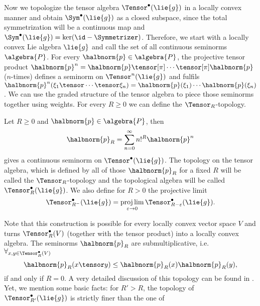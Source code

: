 \documentclass[
11pt,                          %
english                        %
]{article}
\begin{document}
Now we topologize the tensor algebra $\Tensor^{\bullet}(\lie{g})$ in a locally convex 
manner and obtain $\Sym^{\bullet}(\lie{g})$ as a closed subspace, since the total 
symmetrization will be a continuous map and $\Sym^{\bullet}(\lie{g}) = \ker (\id - 
\Symmetrizer)$. Therefore, we start with a locally convex Lie algebra $\lie{g}$ and 
call the set of all continuous seminorms $\algebra{P}$. For every $\halbnorm{p} \in 
\algebra{P}$, the projective tensor product $\halbnorm{p}^n = \halbnorm{p} 
\tensor[\pi] \cdots \tensor[\pi] \halbnorm{p}$ ($n$-times) defines a seminorm on 
$\Tensor^n(\lie{g})$ and fulfils $\halbnorm{p}^n(\xi_1 \tensor \cdots \tensor \xi_n) 
= \halbnorm{p}(\xi_1) \cdots \halbnorm{p}(\xi_n)$. We can use the graded structure of 
the tensor algebra to piece those seminorms together using weights. For every 
$R \geq 0$ we can define the $\Tensor_R$-topology.
\begin{definition}
	\label{def:TR-topology}
	Let $R \geq 0$ and $\halbnorm{p} \in \algebra{P}$, then 
	\begin{equation}
		\label{def:TR-seminorms}
		\halbnorm{p}_R
		=
		\sum\limits_{n=0}^\infty
		n!^R \halbnorm{p}^n
	\end{equation}
	gives a continuous seminorm on $\Tensor^{\bullet}(\lie{g})$. 
	The topology on the tensor algebra, which is
	defined by all of those $\halbnorm{p}_R$ for a fixed $R$ will be called the 
	$\Tensor_R$-topology and the topological algebra will be called 
	$\Tensor_R^{\bullet}(\lie{g})$. We also define for $R > 0$ the projective limit
	\begin{equation}
		\label{def:TR-projective}
		\Tensor_{R^-}^{\bullet}(\lie{g})
		=
		\projlim\limits_{\varepsilon \rightarrow 0}
		\Tensor_{R - \varepsilon}^{\bullet}(\lie{g}).
	\end{equation}
\end{definition}
Note that this construction is possible for every locally convex vector space $V$ 
and turns $\Tensor_R^{\bullet}(V)$ (together with the tensor product) into a locally 
convex algebra. The seminorms $\halbnorm{p}_R$ are submultiplicative, i.e. 
$\forall_{x, y \in \Tensor_R^{\bullet}(V)}$
\begin{equation}
	\label{eq:TR-submultiplicative}
	\halbnorm{p}_R(x \tensor y)
	\leq
	\halbnorm{p}_R(x)
	\halbnorm{p}_R(y),
\end{equation}
if and only if $R = 0$. A very detailed discussion of this topology can be found in 
\cite{waldmann:2014a}. Yet, we mention some basic facts: for $R' > R$, the 
topology of $\Tensor_{R'}^{\bullet}(\lie{g})$ is strictly finer than the one of 
\end{document}
